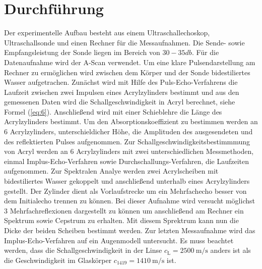 \section{Durchführung}
Der experimentelle Aufbau besteht aus einem Ultraschallechoskop, Ultraschallsonde und einen Rechner für die Messaufnahmen.
Die Sende- sowie Empfangsleistung der Sonde liegen im Bereich von $30 - 35 db$. Für die Datenaufnahme wird der A-Scan verwendet.
Um eine klare Pulsendarstellung am Rechner zu ermöglichen wird zwischen dem Körper und der Sonde bidestiliertes Wasser aufgetrachen.
Zunächst wird mit Hilfe des Puls-Echo-Verfahrens die Laufzeit zwischen zwei Impulsen eines Acrylzylinders bestimmt und aus den gemessenen
Daten wird die Schallgeschwindigkeit in Acryl berechnet, siehe Formel (\ref{eq:6}).
Anschließend wird mit einer Schieblehre die Länge des Acrylzylinders bestimmt.
Um den Absorptionskoeffizient zu bestimmen werden an 6 Acrylzylinders, unterschieldicher Höhe, die Amplituden des ausgesendeten und des reflektierten Pulses aufgenommen.
Zur Schallgeschwindigkeitsbestimmmung von Acryl werden an 6 Acrylzylinders mit zwei unterschiedlichen Messmethoden, einmal Implus-Echo-Verfahren sowie Durchschallungs-Verfahren,
die Laufzeiten aufgenommen.
\newline
Zur Spektralen Analye werden zwei Acrylscheiben mit bidestiliertes Wasser gekoppelt und anschließend unterhalb eines Acrylzylinders gestellt.
Der Zylinder dient als Vorlaufstrecke um ein Mehrfachecho besser von dem Initialecho trennen zu können. Bei dieser Aufnahme wird versucht möglichst 3
Mehrfachreflexionen dargestellt zu können um anschließend am Rechner ein Spektrum sowie Cepstrum zu erhalten. Mit diesem Sprektrum kann nun die Dicke
der beiden Scheiben bestimmt werden.
Zur letzten Messaufnahme wird das Implus-Echo-Verfahren auf ein Augenmodell untersucht. Es muss beachtet werden, dass die Schallgeschwindigkeit in der Linse 
$c_\text{L} = \SI{2500}{\metre\per\second}$ anders ist als die Geschwindigkeit im Glaskörper $c_\text{1419} = \SI{1410}{\metre\per\second}$ ist.
